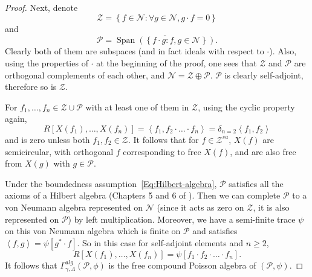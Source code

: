 \documentclass[12pt]{amsart}
\theoremstyle{definition}
\newcommand{\set}[1]{\left\{#1\right\}}
\newcommand{\mc}[1]{\mathcal{#1}}
\newcommand{\ip}[2]{\left \langle{#1},{#2} \right \rangle}
\DeclareMathOperator{\Span}{\mathrm{Span}}
\begin{document}
\begin{proof}
Next, denote
\[
\mc{Z} = \set{f \in \mc{N} : \forall g \in \mc{N}, g \cdot f = 0}
\]
and
\[
\mc{P} = \overline{\Span(\set{ f \cdot g : f, g \in \mc{N}})}.
\]
Clearly both of them are subspaces (and in fact ideals with respect to $\cdot$). Also, using the properties of $\cdot$ at the beginning of the proof, one sees that $\mc{Z}$ and $\mc{P}$ are orthogonal complements of each other, and $\mc{N} = \mc{Z} \oplus \mc{P}$. $\mc{P}$ is clearly self-adjoint, therefore so is $\mc{Z}$.  %

For $f_1, \ldots, f_n \in \mc{Z} \cup \mc{P}$ with at least one of them in $\mc{Z}$, using the cyclic property again,
\[
R[X(f_1), \ldots, X(f_n)] = \ip{f_1}{f_2 \cdot \ldots \cdot f_n} = \delta_{n=2} \ip{f_1}{f_2}
\]
and is zero unless both $f_1, f_2 \in \mc{Z}$. It follows that for $f \in \mc{Z}^{sa}$, $X(f)$ are semicircular, with orthogonal $f$ corresponding to free $X(f)$, and are also free from $X(g)$ with $g \in \mc{P}$.

Under the boundedness assumption~\eqref{Eq:Hilbert-algebra}, $\mc{P}$ satisfies all the axioms of a Hilbert algebra (Chapters 5 and 6 of \cite{Dixmier-vN}). Then we can complete $\mc{P}$ to a von Neumann algebra represented on $\mc{N}$ (since it acts as zero on $\mc{Z}$, it is also represented on $\mc{P}$) by left multiplication. Moreover, we have a semi-finite trace $\psi$ on this von Neumann algebra which is finite on $\mc{P}$ and satisfies $\ip{f}{g} = \psi[g^\ast \cdot f]$. So in this case for self-adjoint elements and $n \geq 2$,
\[
R[X(f_1), \ldots, X(f_n)] = \psi[f_1 \cdot f_2 \cdot \ldots \cdot f_n].
\]
It follows that $\Gamma^{alg}_{\gamma, \Lambda}(\mc{P}, \phi)$ is the free compound Poisson algebra of $(\mc{P}, \psi)$.
\end{proof}
\end{document}
